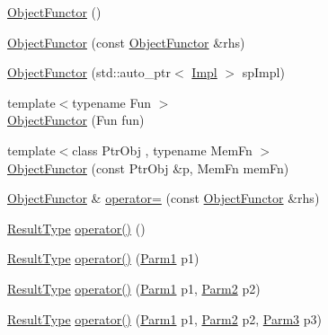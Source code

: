 \begin{DoxyCompactItemize}
\item 
\mbox{\hyperlink{classUtil_1_1ObjectFunctor_ac08a0820c0cf21a61abb6da3ede541d4}{Object\+Functor}} ()
\item 
\mbox{\hyperlink{classUtil_1_1ObjectFunctor_a2d42842ec3d69b317aaaafd65cd9e2fd}{Object\+Functor}} (const \mbox{\hyperlink{classUtil_1_1ObjectFunctor}{Object\+Functor}} \&rhs)
\item 
\mbox{\hyperlink{classUtil_1_1ObjectFunctor_a60702c933bbfec0d0a0e4459debe21b7}{Object\+Functor}} (std\+::auto\+\_\+ptr$<$ \mbox{\hyperlink{classUtil_1_1ObjectFunctor_a93fc635194d1d2768e73ba87d03abd8d}{Impl}} $>$ sp\+Impl)
\item 
{\footnotesize template$<$typename Fun $>$ }\\\mbox{\hyperlink{classUtil_1_1ObjectFunctor_a8a0c7fe30526a774ce94c7a24af4108d}{Object\+Functor}} (Fun fun)
\item 
{\footnotesize template$<$class Ptr\+Obj , typename Mem\+Fn $>$ }\\\mbox{\hyperlink{classUtil_1_1ObjectFunctor_a346fdbed7070eeafec9270c9a5a766ec}{Object\+Functor}} (const Ptr\+Obj \&p, Mem\+Fn mem\+Fn)
\item 
\mbox{\hyperlink{classUtil_1_1ObjectFunctor}{Object\+Functor}} \& \mbox{\hyperlink{classUtil_1_1ObjectFunctor_a90395c8be24965e154bee2f7813a78e8}{operator=}} (const \mbox{\hyperlink{classUtil_1_1ObjectFunctor}{Object\+Functor}} \&rhs)
\item 
\mbox{\hyperlink{classUtil_1_1ObjectFunctor_a77f816e98108848347d0dfc085090a1c}{Result\+Type}} \mbox{\hyperlink{classUtil_1_1ObjectFunctor_a47ff83bbdf075aefe2ee26aafafd88a1}{operator()}} ()
\item 
\mbox{\hyperlink{classUtil_1_1ObjectFunctor_a77f816e98108848347d0dfc085090a1c}{Result\+Type}} \mbox{\hyperlink{classUtil_1_1ObjectFunctor_affe11b4a42e49e60ac921c2353e3ce18}{operator()}} (\mbox{\hyperlink{classUtil_1_1ObjectFunctor_a199715d28029627c2ae7219c13b04d26}{Parm1}} p1)
\item 
\mbox{\hyperlink{classUtil_1_1ObjectFunctor_a77f816e98108848347d0dfc085090a1c}{Result\+Type}} \mbox{\hyperlink{classUtil_1_1ObjectFunctor_a95148ad6414e7e28998227841c27be6c}{operator()}} (\mbox{\hyperlink{classUtil_1_1ObjectFunctor_a199715d28029627c2ae7219c13b04d26}{Parm1}} p1, \mbox{\hyperlink{classUtil_1_1ObjectFunctor_a6809cf65883dc7575e01d9b9849649cf}{Parm2}} p2)
\item 
\mbox{\hyperlink{classUtil_1_1ObjectFunctor_a77f816e98108848347d0dfc085090a1c}{Result\+Type}} \mbox{\hyperlink{classUtil_1_1ObjectFunctor_a6dea319b30584bd1bb9f6bf4b8d36e11}{operator()}} (\mbox{\hyperlink{classUtil_1_1ObjectFunctor_a199715d28029627c2ae7219c13b04d26}{Parm1}} p1, \mbox{\hyperlink{classUtil_1_1ObjectFunctor_a6809cf65883dc7575e01d9b9849649cf}{Parm2}} p2, \mbox{\hyperlink{classUtil_1_1ObjectFunctor_a6becd26610c6091b9ba93cd96f3def66}{Parm3}} p3)

\end{DoxyCompactItemize}
